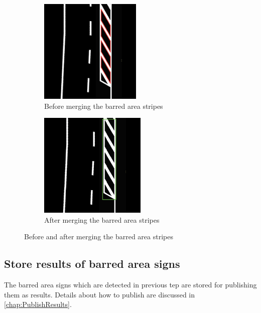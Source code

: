\begin{figure}[ht]
\begin{subfigure}{0.5\textwidth}
\centering
\includegraphics[width=0.9\linewidth,height=5cm]{images/UnmergedBarredAreaStripes.jpeg} 
\caption{Before merging the barred area stripes}
\end{subfigure}
\begin{subfigure}{0.5\textwidth}
\centering
\includegraphics[width=0.9\linewidth,height=5cm]{images/MergedBarredAreaStripes.jpeg} 
\caption{After merging the barred area stripes}
\end{subfigure}
\caption{Before and after merging the barred area stripes}
\label{fig:BeforeAfterMergingBarredAreaStripes}
\end{figure}

\subsection{Store results of barred area signs}
\label{sec:BarredAreaStoreResults}
The barred area signs which are detected in previous tep are stored for publishing them as results. Details about how to publish are discussed in \autoref{chap:PublishResults}.